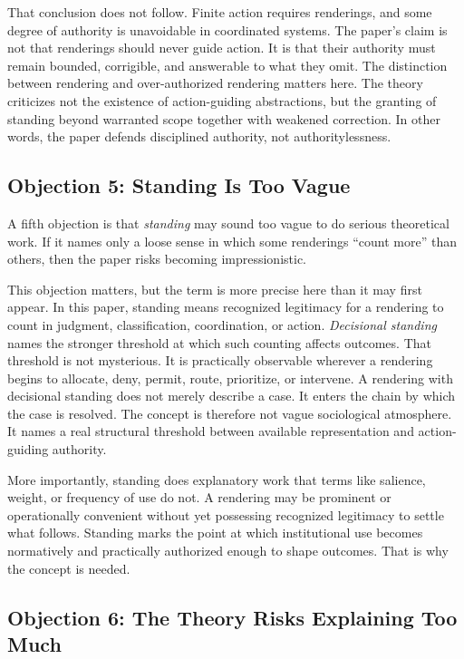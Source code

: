 \documentclass[11pt]{article}
\renewcommand{\emph}[1]{\textit{#1}}
\begin{document}
That conclusion does not follow. Finite action requires renderings, and some degree of authority is unavoidable in coordinated systems. The paper's claim is not that renderings should never guide action. It is that their authority must remain bounded, corrigible, and answerable to what they omit. The distinction between rendering and over-authorized rendering matters here. The theory criticizes not the existence of action-guiding abstractions, but the granting of standing beyond warranted scope together with weakened correction. In other words, the paper defends disciplined authority, not authoritylessness.

\subsection{Objection 5: Standing Is Too Vague}

A fifth objection is that \emph{standing} may sound too vague to do serious theoretical work. If it names only a loose sense in which some renderings ``count more'' than others, then the paper risks becoming impressionistic.

This objection matters, but the term is more precise here than it may first appear. In this paper, standing means recognized legitimacy for a rendering to count in judgment, classification, coordination, or action. \emph{Decisional standing} names the stronger threshold at which such counting affects outcomes. That threshold is not mysterious. It is practically observable wherever a rendering begins to allocate, deny, permit, route, prioritize, or intervene. A rendering with decisional standing does not merely describe a case. It enters the chain by which the case is resolved. The concept is therefore not vague sociological atmosphere. It names a real structural threshold between available representation and action-guiding authority.

More importantly, standing does explanatory work that terms like salience, weight, or frequency of use do not. A rendering may be prominent or operationally convenient without yet possessing recognized legitimacy to settle what follows. Standing marks the point at which institutional use becomes normatively and practically authorized enough to shape outcomes. That is why the concept is needed.

\subsection{Objection 6: The Theory Risks Explaining Too Much}
\end{document}
